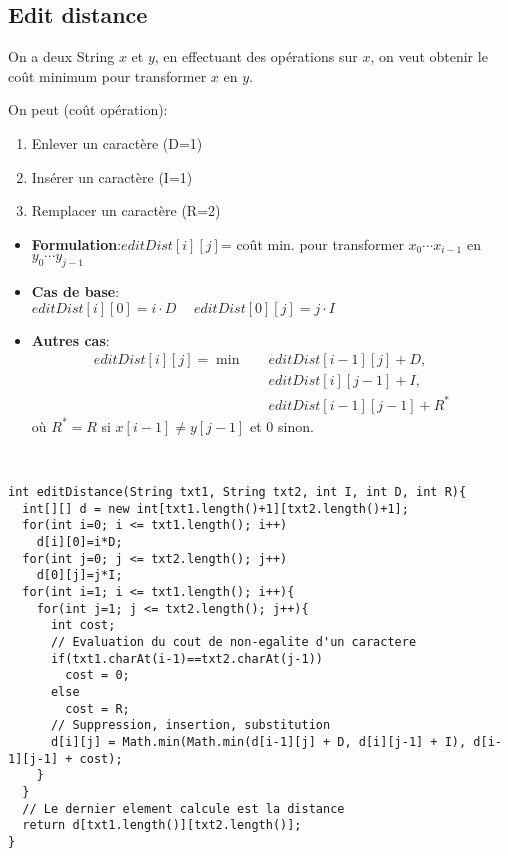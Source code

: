 \subsection{Edit distance}
On a deux String $x$ et $y$, en effectuant des opérations sur $x$, on veut obtenir le coût minimum pour transformer $x$ en $y$.

On peut (coût opération):
\begin{enumerate}
 \item Enlever un caractère (D=1)
 \item Insérer un caractère (I=1)
 \item Remplacer un caractère (R=2)
\end{enumerate}

\begin{itemize}
 \item \textbf{Formulation}:$
 editDist[i][j] $= coût min. pour transformer $x_0 \cdots x_{i - 1}$ en $y_0 \cdots y_{j - 1}$
 \item \textbf{Cas de base}: \\$ editDist[i][0] = i \cdot D \hspace{15pt}
 editDist[0][j] = j \cdot I$
 \item \textbf{Autres cas}:
 \begin{align*}
 editDist[i][j] = \min  \quad  & editDist[i - 1][j] + D, \\
                               & editDist[i][j - 1] + I, \\
                               & editDist[i - 1][j - 1] + R^*
 \end{align*}
 où $R^* = R$ si $x[i-1] \neq y[j-1]$ et $0$ sinon.
\end{itemize}
\ \newline
\begin{lstlisting}
int editDistance(String txt1, String txt2, int I, int D, int R){
  int[][] d = new int[txt1.length()+1][txt2.length()+1];
  for(int i=0; i <= txt1.length(); i++)
    d[i][0]=i*D;
  for(int j=0; j <= txt2.length(); j++)
    d[0][j]=j*I;
  for(int i=1; i <= txt1.length(); i++){
    for(int j=1; j <= txt2.length(); j++){
      int cost;
      // Evaluation du cout de non-egalite d'un caractere
      if(txt1.charAt(i-1)==txt2.charAt(j-1))
        cost = 0;
      else
        cost = R;
      // Suppression, insertion, substitution
      d[i][j] = Math.min(Math.min(d[i-1][j] + D, d[i][j-1] + I), d[i-1][j-1] + cost);
    }
  }
  // Le dernier element calcule est la distance
  return d[txt1.length()][txt2.length()];
}
\end{lstlisting}